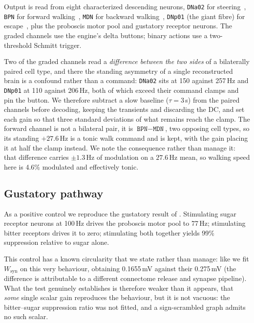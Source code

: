 \documentclass[10pt,twoside]{article}
\newcommand{\cell}[1]{\texttt{#1}}
\begin{document}
Output is read from eight characterized descending neurons,
\cell{DNa02} for steering~\citep{rayshubskiy2025}, \cell{BPN} for forward
walking~\citep{bidaye2020}, \cell{MDN} for backward walking~\citep{bidaye2014},
\cell{DNp01} (the giant fibre) for escape~\citep{vonreyn2014}, plus the
proboscis motor pool and gustatory receptor neurons. The graded channels use
the engine's delta buttons; binary actions use a two-threshold Schmitt trigger.

Two of the graded channels read a \emph{difference between the two sides} of a
bilaterally paired cell type, and there the standing asymmetry of a single
reconstructed brain is a confound rather than a command: \cell{DNa02} sits at
150 against 257\,Hz and \cell{DNp01} at 110 against 206\,Hz, both of which
exceed their command clamps and pin the button. We therefore subtract a slow
baseline ($\tau=3$\,s) from the paired channels before decoding, keeping the
transients and discarding the DC, and set each gain so that three standard
deviations of what remains reach the clamp. The forward channel is not a
bilateral pair, it is $\cell{BPN}-\cell{MDN}$, two opposing cell types,
so its standing $+27.6$\,Hz is a tonic walk command and is kept, with the gain
placing it at half the clamp instead. We note the consequence rather than
manage it: that difference carries $\pm1.3$\,Hz of modulation on a $27.6$\,Hz
mean, so walking speed here is 4.6\% modulated and effectively tonic.

\subsection{Gustatory pathway}

As a positive control we reproduce the gustatory result of \citet{shiu2024}.
Stimulating sugar receptor neurons at 100\,Hz drives the proboscis motor pool
to 77\,Hz; stimulating bitter receptors drives it to zero; stimulating both
together yields 99\% suppression relative to sugar alone.

This control has a known circularity that we state rather than manage: like
\citet{shiu2024} we fit $W_{\mathrm{syn}}$ on this very behaviour, obtaining
0.1655\,mV against their 0.275\,mV (the difference is attributable to a
different connectome release and synapse pipeline). What the test genuinely
establishes is therefore weaker than it appears, that \emph{some} single
scalar gain reproduces the behaviour, but it is not vacuous: the
bitter--sugar suppression ratio was not fitted, and a sign-scrambled graph
admits no such scalar.
\end{document}
